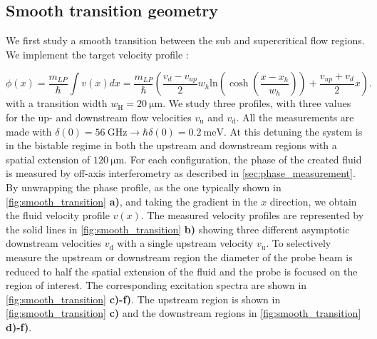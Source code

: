 \subsection{Smooth transition geometry}

We first study a smooth transition between the sub and supercritical flow regions.
We implement the target velocity profile : 

\begin{equation}
    \phi(x) = \dfrac{m_{LP}}{\hbar} \int v(x) dx = \dfrac{m_{LP}}{\hbar} \left( \dfrac{v_{d}-v_{up}}{2} w_h \mathrm{ln}(\cosh(\dfrac{x-x_h}{w_h}))+\dfrac{v_{up}+v_{d}}{2}x \right).
    \label{eq:target_phase_profile}
\end{equation}
with a transition width $w_\mathrm{H}=\SI{20}{\micro\meter}$. 
We study three profiles, with three values for the up- and downstream flow velocities $v_\mathrm{u}$ and $v_\mathrm{d}$.
All the measurements are made with $\delta(0)=\SI{56}{\giga\hertz}\rightarrow \hbar\delta(0)= \SI{0.2}{\milli \electronvolt}$.
At this detuning the system is in the bistable regime in both the upstream and downstream regions with a spatial extension of $\SI{120}{\micro \meter}$.
For each configuration, the phase of the created fluid is measured by off-axis interferometry as described in \autoref{sec:phase_measurement}. By unwrapping the phase profile, as the one typically shown in \autoref{fig:smooth_transition} \textbf{a)}, and taking the gradient in the $x$ direction, we obtain the fluid velocity profile $v(x)$.
The measured velocity profiles are represented by the solid lines in \autoref{fig:smooth_transition} \textbf{\textbf{b)}} showing three different asymptotic downstream velocities $v_\mathrm{d}$ with a single upstream velocity $v_\mathrm{u}$. 
To selectively measure the upstream or downstream region the diameter of the probe beam is reduced to half the spatial extension of the fluid and the probe is focused on the region of interest. The corresponding excitation spectra are shown in \autoref{fig:smooth_transition} \textbf{c)-f)}. 
The upstream region is shown in \autoref{fig:smooth_transition} \textbf{c)} and the downstream regions in \autoref{fig:smooth_transition} \textbf{d)-f)}.

